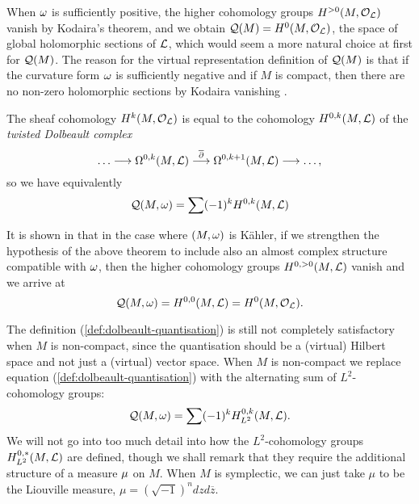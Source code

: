 \begin{rmk}
	When $\omega$ is sufficiently positive, the higher cohomology groups $H^{>0}(M,\mathcal{O}_{\mathcal{L}})$ vanish by Kodaira's theorem, and we obtain $\mathcal{Q}(M) = H^{0}(M,\mathcal{O}_{\mathcal{L}})$, \ie the space of global holomorphic sections of $\mathcal{L}$, which would seem a more natural choice at first for $\mathcal{Q}(M)$. The reason for the virtual representation definition of $\mathcal{Q}(M)$ is that if the curvature form $\omega$ is sufficiently negative and if $M$ is compact, then there are no non-zero holomorphic sections by Kodaira vanishing \cite{Guillemin2002MomentMC}.
\end{rmk}

The sheaf cohomology $H^{k}(M,\mathcal{O}_{\mathcal{L}})$ is equal to the cohomology $H^{0,k}(M,\mathcal{L})$ of the \emph{twisted Dolbeault complex}
\begin{equation*}
	\ldots \longrightarrow \Omega^{0,k}(M,\mathcal{L}) \overset{\overline{\partial}}{\longrightarrow} \Omega^{0,k+1}(M,\mathcal{L}) \longrightarrow \ldots,
\end{equation*}
so we have equivalently
\begin{equation}
	\label{def:dolbeault-quantisation}
	\mathcal{Q}(M,\omega) = \sum(-1)^{k}H^{0,k}(M,\mathcal{L})
\end{equation}

\begin{rmk}
	It is shown in \cite{GGK02} that in the case where $(M,\omega)$ is K{\"a}hler, \ie if we strengthen the hypothesis of the above theorem to include also an almost complex structure compatible with $\omega$, then the higher cohomology groups $H^{0,>0}(M,\mathcal{L})$ vanish and we arrive at
	\begin{equation*}
		\mathcal{Q}(M,\omega) = H^{0,0}(M,\mathcal{L}) = H^{0}(M,\mathcal{O}_{\mathcal{L}}).
	\end{equation*}
\end{rmk}

The definition (\ref{def:dolbeault-quantisation}) is still not completely satisfactory when $M$ is non-compact, since the quantisation should be a (virtual) Hilbert space and not just a (virtual) vector space. When $M$ is non-compact we replace equation (\ref{def:dolbeault-quantisation}) with the alternating sum of $L^{2}$-cohomology groups:
\begin{equation}
	\mathcal{Q}(M,\omega) = \sum (-1)^{k}H^{0,k}_{L^{2}}(M,\mathcal{L}).
\end{equation}
We will not go into too much detail into how the $L^{2}$-cohomology groups $H^{0,\ast}_{L^{2}}(M,\mathcal{L})$ are defined, though we shall remark that they require the additional structure of a measure $\mu$ on $M$. When $M$ is symplectic, we can just take $\mu$ to be the Liouville measure, \ie $\mu = (\sqrt{-1})^{n}dzd\overline{z}$.

